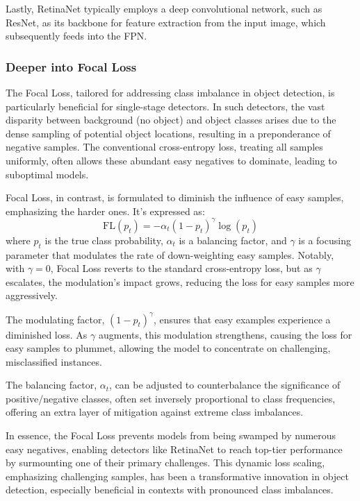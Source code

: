 \documentclass{article}
\begin{document}
Lastly, RetinaNet typically employs a deep convolutional network, such as ResNet, as its backbone for feature extraction from the input image, which subsequently feeds into the FPN.

\subsubsection{Deeper into Focal Loss}

The Focal Loss, tailored for addressing class imbalance in object detection, is particularly beneficial for single-stage detectors. In such detectors, the vast disparity between background (no object) and object classes arises due to the dense sampling of potential object locations, resulting in a preponderance of negative samples. The conventional cross-entropy loss, treating all samples uniformly, often allows these abundant easy negatives to dominate, leading to suboptimal models.

Focal Loss, in contrast, is formulated to diminish the influence of easy samples, emphasizing the harder ones. It's expressed as:
\[ \text{FL}(p_t) = -\alpha_t (1 - p_t)^\gamma \log(p_t) \]
where \( p_t \) is the true class probability, \( \alpha_t \) is a balancing factor, and \( \gamma \) is a focusing parameter that modulates the rate of down-weighting easy samples. Notably, with \( \gamma = 0 \), Focal Loss reverts to the standard cross-entropy loss, but as \( \gamma \) escalates, the modulation's impact grows, reducing the loss for easy samples more aggressively.

The modulating factor, \( (1 - p_t)^\gamma \), ensures that easy examples experience a diminished loss. As \( \gamma \) augments, this modulation strengthens, causing the loss for easy samples to plummet, allowing the model to concentrate on challenging, misclassified instances.

The balancing factor, \( \alpha_t \), can be adjusted to counterbalance the significance of positive/negative classes, often set inversely proportional to class frequencies, offering an extra layer of mitigation against extreme class imbalances.

In essence, the Focal Loss prevents models from being swamped by numerous easy negatives, enabling detectors like RetinaNet to reach top-tier performance by surmounting one of their primary challenges. This dynamic loss scaling, emphasizing challenging samples, has been a transformative innovation in object detection, especially beneficial in contexts with pronounced class imbalances.
\end{document}
